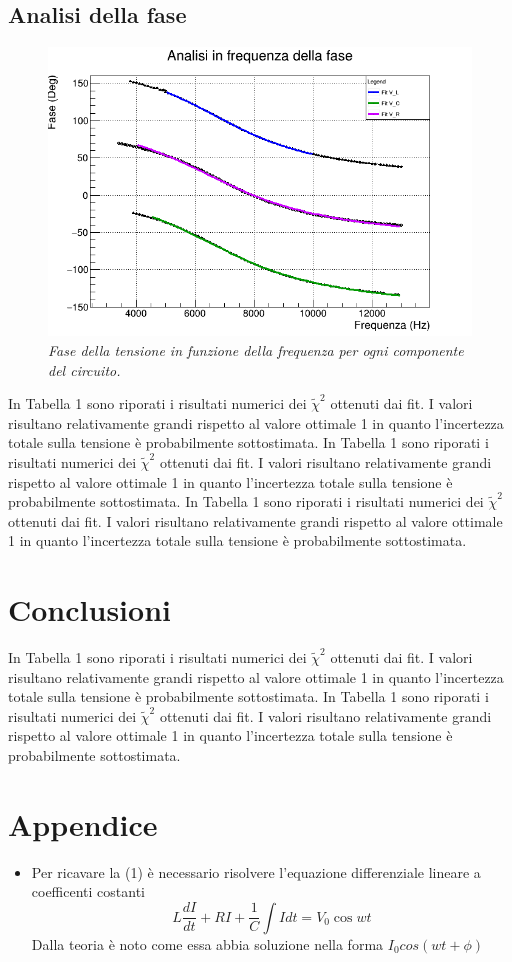 \documentclass{article}
\begin{document}
\subsection{Analisi della fase}
\begin{figure}[h]
  \centering
  \includegraphics[scale=0.45]{FaseFreq.png}
  \caption{\textit{Fase della tensione in funzione della frequenza per ogni componente del circuito.}}
\end{figure}
In Tabella 1 sono riporati i risultati numerici dei $\tilde{\chi}^2$ ottenuti dai fit. I valori risultano relativamente grandi rispetto al valore ottimale 1 in quanto l'incertezza totale sulla tensione è probabilmente sottostimata.
In Tabella 1 sono riporati i risultati numerici dei $\tilde{\chi}^2$ ottenuti dai fit. I valori risultano relativamente grandi rispetto al valore ottimale 1 in quanto l'incertezza totale sulla tensione è probabilmente sottostimata.
In Tabella 1 sono riporati i risultati numerici dei $\tilde{\chi}^2$ ottenuti dai fit. I valori risultano relativamente grandi rispetto al valore ottimale 1 in quanto l'incertezza totale sulla tensione è probabilmente sottostimata.

\section{Conclusioni}
In Tabella 1 sono riporati i risultati numerici dei $\tilde{\chi}^2$ ottenuti dai fit. I valori risultano relativamente grandi rispetto al valore ottimale 1 in quanto l'incertezza totale sulla tensione è probabilmente sottostimata.
In Tabella 1 sono riporati i risultati numerici dei $\tilde{\chi}^2$ ottenuti dai fit. I valori risultano relativamente grandi rispetto al valore ottimale 1 in quanto l'incertezza totale sulla tensione è probabilmente sottostimata.

\section{Appendice}
\begin{itemize}
  \item Per ricavare la (1) è necessario risolvere l'equazione differenziale lineare a coefficenti costanti
$$
L\frac{dI}{dt}+RI+\frac{1}{C}\int{Idt}=V_0\cos{wt}
$$  
Dalla teoria è noto come essa abbia soluzione nella forma $I_0cos(wt +\phi)$
  
\end{itemize}
\end{document}
